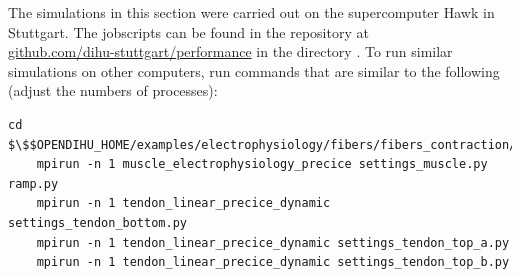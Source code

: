 \begin{reproduce_no_break}
  The simulations in this section were carried out on the supercomputer Hawk in Stuttgart. The jobscripts can be found in the repository at \\ \href{https://github.com/dihu-stuttgart/performance}{github.com/dihu-stuttgart/performance} in the directory . To run similar simulations on other computers, run commands that are similar to the following (adjust the numbers of processes):
  \begin{lstlisting}[columns=fullflexible,breaklines=true,postbreak=\mbox{\textcolor{gray}{$\hookrightarrow$}\space}]
    cd $\$$OPENDIHU_HOME/examples/electrophysiology/fibers/fibers_contraction/with_tendons_precice/multiple_tendons_with_electrophysiology
    mpirun -n 1 muscle_electrophysiology_precice settings_muscle.py ramp.py
    mpirun -n 1 tendon_linear_precice_dynamic settings_tendon_bottom.py
    mpirun -n 1 tendon_linear_precice_dynamic settings_tendon_top_a.py
    mpirun -n 1 tendon_linear_precice_dynamic settings_tendon_top_b.py
  \end{lstlisting}
\end{reproduce_no_break}







%

